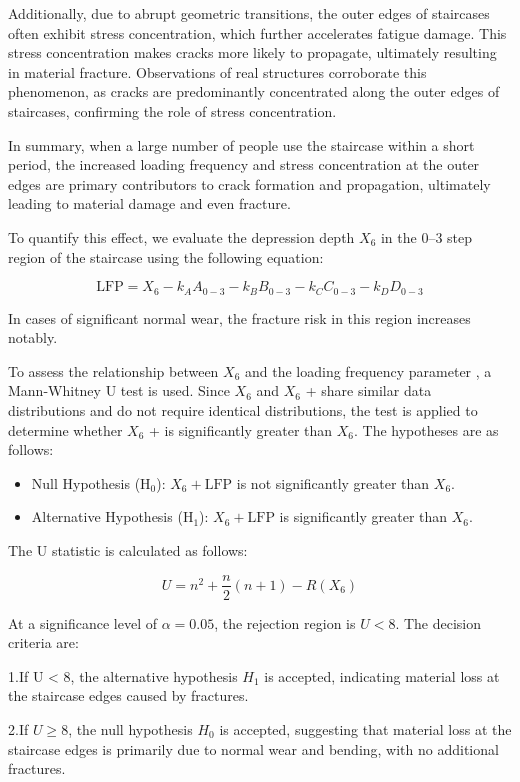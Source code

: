 \documentclass{mcmthesis}
\begin{document}
Additionally, due to abrupt geometric transitions, the outer edges of staircases often exhibit stress concentration, which further accelerates fatigue damage. This stress concentration makes cracks more likely to propagate, ultimately resulting in material fracture. Observations of real structures corroborate this phenomenon, as cracks are predominantly concentrated along the outer edges of staircases, confirming the role of stress concentration.

In summary, when a large number of people use the staircase within a short period, the increased loading frequency and stress concentration at the outer edges are primary contributors to crack formation and propagation, ultimately leading to material damage and even fracture.

To quantify this effect, we evaluate the depression depth $X_6$ in the 0–3 step region of the staircase using the following equation:


\[\text{LFP} = X_6 - k_A A_{0-3} - k_B B_{0-3} - k_C C_{0-3} - k_D D_{0-3}\]


In cases of significant normal wear, the fracture risk in this region increases notably. 

To assess the relationship between $X_6$ and the loading frequency parameter , a Mann-Whitney U test is used. Since $X_6$ and $X_6$ +  share similar data distributions and do not require identical distributions, the test is applied to determine whether $X_6$ +  is significantly greater than $X_6$. The hypotheses are as follows:


\begin{itemize} 
\item Null Hypothesis (H\(_0\)): \(X_6 + \text{LFP}\) is not significantly greater than \(X_6\). 
\item Alternative Hypothesis (H\(_1\)): \(X_6 + \text{LFP}\) is significantly greater than \(X_6\). 
\end{itemize}

The U statistic is calculated as follows:

$$U = n^2 + \frac{n}{2}(n + 1) - R(X_6)$$

At a significance level of \(\alpha = 0.05\), the rejection region is \(U < 8\). The decision criteria are:

1.If U < 8, the alternative hypothesis $H_1$ is accepted, indicating material loss at the staircase edges caused by fractures.

2.If \(U \geq 8\), the null hypothesis $H_0$ is accepted, suggesting that material loss at the staircase edges is primarily due to normal wear and bending, with no additional fractures.
\end{document}
